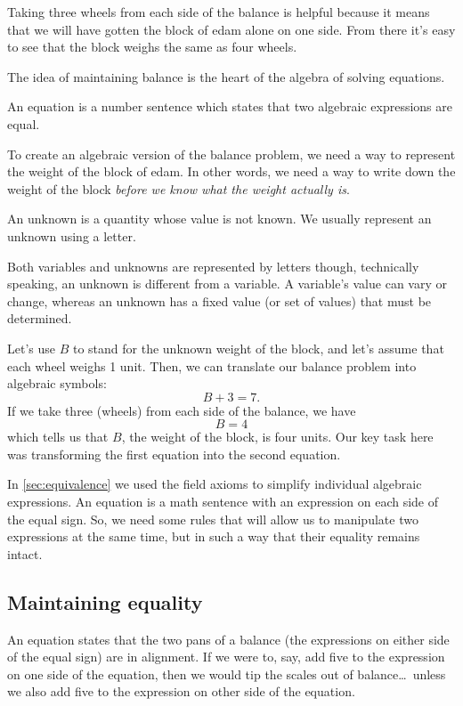Taking three wheels from each side of the balance is helpful because it means that we will have gotten the block of edam alone on one side. From there it's easy to see that the block weighs the same as four wheels.

The idea of maintaining balance is the heart of the algebra of solving equations.

\begin{boxdef}[Equation]
An \gls{equation} is a number sentence which states that two algebraic expressions are equal.
\end{boxdef}

To create an algebraic version of the balance problem, we need a way to represent the weight of the block of edam. In other words, we need a way to write down the weight of the block \textit{before we know what the weight actually is}.

\begin{boxdef}[Unknown]
An \gls{unknown} is a quantity whose value is not known. We usually represent an unknown using a letter.

Both variables and unknowns are represented by letters though, technically speaking, an unknown is different from a variable. A variable's value can vary or change, whereas an unknown has a fixed value (or set of values) that must be determined.
\end{boxdef}

Let's use $B$ to stand for the unknown weight of the block, and let's assume that each wheel weighs 1 unit. Then, we can translate our balance problem into algebraic symbols: \[B + 3 = 7.\] If we take three (wheels) from each side of the balance, we have \[B = 4\] which tells us that $B$, the weight of the block, is four units. Our key task here was transforming the first equation into the second equation.

In \cref{sec:equivalence} we used the field axioms to simplify individual algebraic expressions. An equation is a math sentence with an expression on each side of the equal sign. So, we need some rules that will allow us to manipulate two expressions at the same time, but in such a way that their equality remains intact.

\subsection{Maintaining equality}

An equation states that the two pans of a balance (the expressions on either side of the equal sign) are in alignment. If we were to, say, add five to the expression on one side of the equation, then we would tip the scales out of balance\ldots\ unless we also add five to the expression on other side of the equation.

